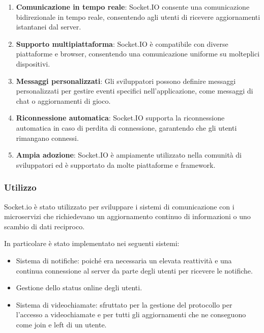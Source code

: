 \begin{enumerate}
    \item \textbf{Comunicazione in tempo reale}: Socket.IO consente una comunicazione bidirezionale in tempo reale, consentendo agli utenti di ricevere aggiornamenti istantanei dal server.

    \item \textbf{Supporto multipiattaforma}: Socket.IO è compatibile con diverse piattaforme e browser, consentendo una comunicazione uniforme su molteplici dispositivi.

    \item \textbf{Messaggi personalizzati}: Gli sviluppatori possono definire messaggi personalizzati per gestire eventi specifici nell'applicazione, come messaggi di chat o aggiornamenti di gioco.

    \item \textbf{Riconnessione automatica}: Socket.IO supporta la riconnessione automatica in caso di perdita di connessione, garantendo che gli utenti rimangano connessi.

    \item \textbf{Ampia adozione}: Socket.IO è ampiamente utilizzato nella comunità di sviluppatori ed è supportato da molte piattaforme e framework.

\end{enumerate}

%
%
%
\subsubsection{Utilizzo}

Socket.io è stato utilizzato per sviluppare i sistemi di comunicazione con i microservizi che richiedevano un aggiornamento continuo di informazioni o uno scambio di dati reciproco.

In particolare è stato implementato nei seguenti sistemi:

\begin{itemize}
    \item Sistema di notifiche: poiché era necessaria un elevata reattività e una continua connessione al server da parte degli utenti per ricevere le notifiche.

    \item Gestione dello status online degli utenti.
    
    \item Sistema di videochiamate: sfruttato per la gestione del protocollo per l'accesso a videochiamate e per tutti gli aggiornamenti che ne conseguono come join e left di un utente.
\end{itemize}

